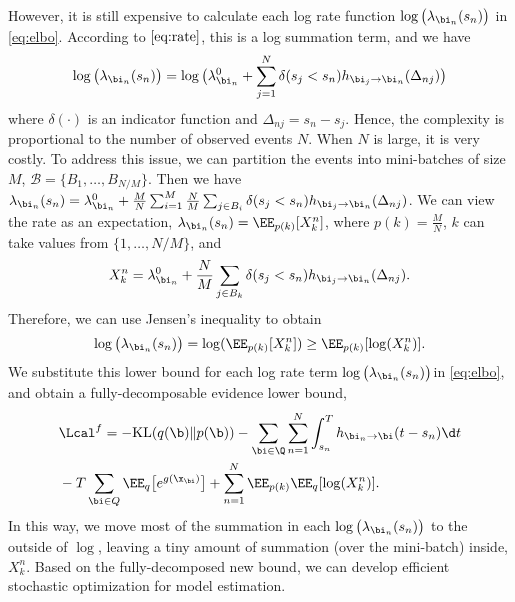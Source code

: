 However, it is still expensive to calculate each log rate function $\log\big(\lambda_{\bi_n}(s_n)\big)$ in \eqref{eq:elbo}. According to $\eqref{eq:rate}$, this is a log summation term, and we have 
\[
\log\big(\lambda_{\bi_n}(s_n)\big) = \log\big(\lambda_{\bi_n}^0 + \sum_{j=1}^N \delta(s_j < s_n) h_{\bi_j \rightarrow \bi_n}(\Delta_{nj})\big)
\]
where $\delta(\cdot)$ is an indicator function and $\Delta_{nj} = s_n -s_j$. Hence, the complexity is proportional to the number of observed events $N$. When $N$ is large, it is very costly. To address this issue, we can partition the events into mini-batches of size $M$,  $\mathcal{B} = \{B_1, \ldots, B_{N/M}\}$. Then we have $\lambda_{\bi_n}(s_n) = \lambda_{\bi_n}^0 + \frac{M}{N}\sum_{i=1}^M \frac{N}{M}\sum_{j \in B_i}\delta(s_j < s_n) h_{\bi_j \rightarrow \bi_n}(\Delta_{nj})$. We can view the rate as an expectation, $\lambda_{\bi_n}(s_n) = \EE_{p(k)} [X_k^n]$, where $p(k) = \frac{M}{N}$, $k$ can take values from $\{1, \ldots, N/M\}$, and 
\begin{align}
X_k^n = \lambda_{\bi_n}^0 + \frac{N}{M}\sum_{j \in B_k}\delta(s_j < s_n) h_{\bi_j \rightarrow \bi_n}(\Delta_{nj}). \label{eq:Xkn}
\end{align}
Therefore, we can use Jensen's inequality to obtain 
\[
\log\big(\lambda_{\bi_n}(s_n)\big)  = \log(\EE_{p(k)} [X_k^n]) \ge \EE_{p(k)}[ \log(X_k^n)].
\]
We substitute this lower bound for each log rate term $\log\big(\lambda_{\bi_n}(s_n)\big)$in \eqref{eq:elbo}, and obtain a fully-decomposable evidence lower bound, 
\begin{align}
&\Lcal^f = -\mathrm{KL}(q(\b) \| p(\b)) -\sum_{\bi \in \Q}\sum_{n=1}^N \int_{s_n}^T h_{\bi_n \rightarrow \bi}(t-s_n) \d t\notag \\
& -T\sum_{\bi \in Q}\EE_{q}\big[e^{g(\x_\bi)}\big] +\sum_{n=1}^N \EE_{ p(k)} \EE_{q}[\log(X_k^n)]. \label{eq:elbo2}
\end{align}
In this way, we move most of the summation in each $\log\big(\lambda_{\bi_n}(s_n)\big)$ to the outside of $\log$, leaving a tiny amount of summation (over the mini-batch) inside, \ie $X_k^n$. Based on the fully-decomposed new bound, we can develop efficient stochastic optimization for model estimation.
